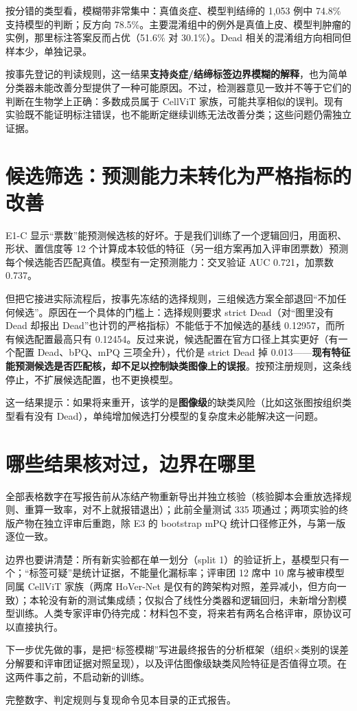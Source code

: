 \documentclass[12pt,a4paper]{article}
\begin{document}
按分错的类型看，模糊带非常集中：真值炎症、模型判结缔的 1,053 例中 74.8\% 支持模型的判断；反方向 78.5\%。主要混淆组中的例外是真值上皮、模型判肿瘤的实例，那里标注答案反而占优（51.6\% 对 30.1\%）。Dead 相关的混淆组方向相同但样本少，单独记录。

按事先登记的判读规则，这一结果\textbf{支持炎症/结缔标签边界模糊的解释}，也为简单分类器未能改善分型提供了一种可能原因。不过，检测器意见一致并不等于它们的判断在生物学上正确：多数成员属于 CellViT 家族，可能共享相似的误判。现有实验既不能证明标注错误，也不能断定继续训练无法改善分类；这些问题仍需独立证据。

\section*{候选筛选：预测能力未转化为严格指标的改善}

E1-C 显示“票数”能预测候选核的好坏。于是我们训练了一个逻辑回归，用面积、形状、置信度等 12 个计算成本较低的特征（另一组方案再加入评审团票数）预测每个候选能否匹配真值。模型有一定预测能力：交叉验证 AUC 0.721，加票数 0.737。

但把它接进实际流程后，按事先冻结的选择规则，三组候选方案全部退回“不加任何候选”。原因在一个具体的门槛上：选择规则要求 strict Dead（对“图里没有 Dead 却报出 Dead”也计罚的严格指标）不能低于不加候选的基线 0.12957，而所有候选配置最高只有 0.12454。反过来说，候选配置在官方口径上其实更好（有一个配置 Dead、bPQ、mPQ 三项全升），代价是 strict Dead 掉 0.013——\textbf{现有特征能预测候选是否匹配核，却不足以控制缺类图像上的误报}。按预注册规则，这条线停止，不扩展候选配置，也不更换模型。

这一结果提示：如果将来重开，该学的是\textbf{图像级}的缺类风险（比如这张图按组织类型看有没有 Dead），单纯增加候选打分模型的复杂度未必能解决这一问题。

\section*{哪些结果核对过，边界在哪里}

全部表格数字在写报告前从冻结产物重新导出并独立核验（核验脚本会重放选择规则、重算一致率，对不上就报错退出）；此前全量测试 335 项通过；两项实验的终版产物在独立评审后重跑，除 E3 的 bootstrap mPQ 统计口径修正外，与第一版逐位一致。

边界也要讲清楚：所有新实验都在单一划分（split 1）的验证折上，基模型只有一个；“标签可疑”是统计证据，不能量化漏标率；评审团 12 席中 10 席与被审模型同属 CellViT 家族（两席 HoVer-Net 是仅有的跨架构对照，差异减小，但方向一致）；本轮没有新的测试集成绩；仅拟合了线性分类器和逻辑回归，未新增分割模型训练。人类专家评审仍待完成：材料包不变，将来若有两名合格评审，原协议可以直接执行。

下一步优先做的事，是把“标签模糊”写进最终报告的分析框架（组织$\times$类别的误差分解要和评审团证据对照呈现），以及评估图像级缺类风险特征是否值得立项。在这两件事之前，不启动新的训练。

完整数字、判定规则与复现命令见本目录的正式报告。
\end{document}

